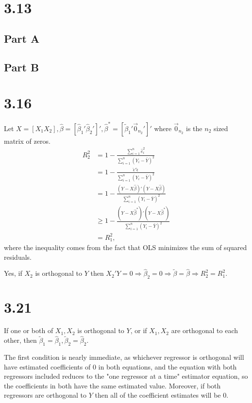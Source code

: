\documentclass[11pt]{article} %
\begin{document}
\section{3.13}
\subsection{Part A}
\subsection{Part B}
\section{3.16}
Let $X = [X_1 X_2], \hat{\beta} = [\hat{\beta}_1' \hat{\beta}_2' ]', \hat{\beta}^{*} = [\tilde{\beta}_1' \vec{0}_{n_2}']'$ where $\vec{0}_{n_2}$ is the $n_2$ sized matrix of zeros.
\begin{align*}
R_2^2 &= 1 - \frac{\sum_{i=1}^n\hat{e}_i^2}{\sum_{i=1}^n (Y_i - \bar{Y})^2}\\
&= 1 - \frac{\hat{\epsilon}'\hat{\epsilon}}{\sum_{i=1}^n (Y_i - \bar{Y})^2}\\
&= 1 - \frac{(Y - X\hat{\beta})'(Y - X\hat{\beta})}{\sum_{i=1}^n (Y_i - \bar{Y})^2}\\
&\geq 1 -  \frac{(Y - X\hat{\beta}^{*})'(Y - X\hat{\beta}^{*})}{\sum_{i=1}^n (Y_i - \bar{Y})^2} \\
&= R_1^2,
\end{align*}
where the inequality comes from the fact that OLS minimizes the sum of squared residuals.

Yes, if $X_2$ is orthogonal to $Y$ then $X_2'Y = 0 \Rightarrow \hat{\beta}_2 = 0 \Rightarrow \tilde{\beta}  = \hat{\beta}  \Rightarrow R^2_2 = R^2_1.$
\section{3.21}

If one or both of $X_1,X_2$ is orthogonal to $Y$, or if $X_1, X_2$ are orthogonal to each other, then $\tilde{\beta}_1 = \hat{\beta}_1, \tilde{\beta}_2 = \hat{\beta}_2.$

The first condition is nearly immediate, as whichever regressor is orthogonal will have estimated coefficients of 0 in both equations, and the equation with both regressors included reduces to the "one regressor at a time" estimator equation, so the coefficients in both have the same estimated value. Moreover, if both regressors are orthogonal to $Y$ then all of the coefficient estimates will be 0.
\end{document}
